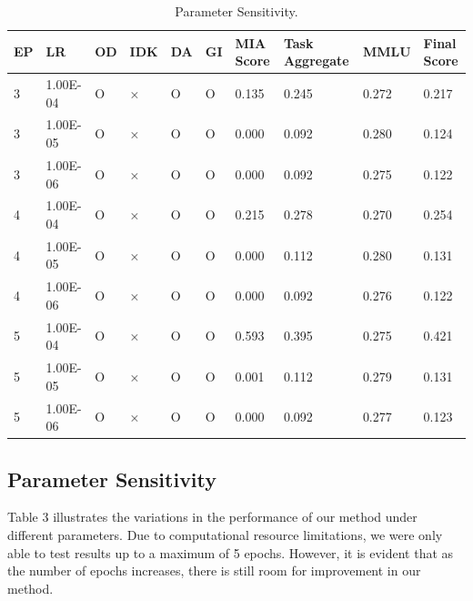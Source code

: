 \documentclass[11pt]{article}
\begin{document}
\begin{table}[t]
  \centering
    \begin{tabular}{|l|l|l|l|l|l|l|l|l|l|}
    \hline
        EP & LR & OD & IDK & DA & GI & MIA Score & Task Aggregate & MMLU & Final Score \\ \hline
        3 & 1.00E-04 & O & × & O & O & 0.135 & 0.245 & 0.272 & 0.217 \\ \hline
        3 & 1.00E-05 & O & × & O & O & 0.000 & 0.092 & 0.280 & 0.124 \\ \hline
        3 & 1.00E-06 & O & × & O & O & 0.000 & 0.092 & 0.275 & 0.122 \\ \hline
        4 & 1.00E-04 & O & × & O & O & 0.215 & 0.278 & 0.270 & 0.254 \\ \hline
        4 & 1.00E-05 & O & × & O & O & 0.000 & 0.112 & 0.280 & 0.131 \\ \hline
        4 & 1.00E-06 & O & × & O & O & 0.000 & 0.092 & 0.276 & 0.122 \\ \hline
        5 & 1.00E-04 & O & × & O & O & 0.593 & 0.395 & 0.275 & 0.421 \\ \hline
        5 & 1.00E-05 & O & × & O & O & 0.001 & 0.112 & 0.279 & 0.131 \\ \hline
        5 & 1.00E-06 & O & × & O & O & 0.000 & 0.092 & 0.277 & 0.123 \\ \hline
    \end{tabular}
  \caption{
    Parameter Sensitivity.  }
\label{tab:AS1}
\end{table}


\subsection{Parameter Sensitivity}  

Table 3 illustrates the variations in the performance of our method under different parameters. Due to computational resource limitations, we were only able to test results up to a maximum of 5 epochs. However, it is evident that as the number of epochs increases, there is still room for improvement in our method.


\end{document}
